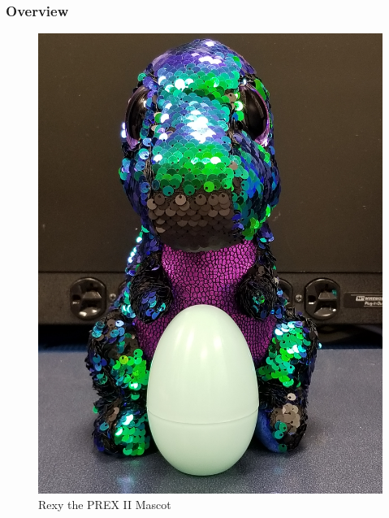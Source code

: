 \documentclass[10pt]{beamer}
\theoremstyle{remark}
\theoremstyle{definition}
\begin{document}
\begin{frame}
	\setcounter{figure}{0}
	\frametitle{Overview} %
	\begin{minipage}[t][0.6\textheight]{0.5\textwidth}
		\vspace{0pt}
		\tableofcontents %
	\end{minipage}
	\hspace{2em}
	\begin{minipage}[t]{0.3\textwidth} 
		{
		\begin{figure}
		\centering
		\vspace{0pt}
		\includegraphics[width=1.2\textwidth]{images/Mascot.jpg}
		\caption{Rexy the PREX II Mascot}
		\end{figure}
		}
	\end{minipage}	
\end{frame}
\end{document}
